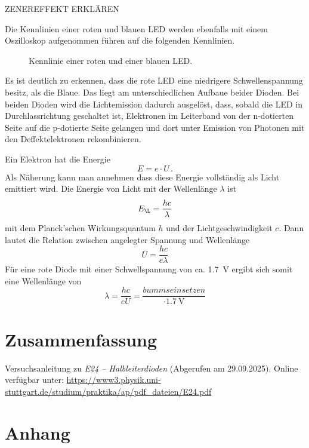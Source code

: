 \documentclass[
12pt,
a4paper,
bibliography=totocnumbered, %
BCOR=1cm, %
oneside, %
]{scrartcl}
\begin{document}
ZENEREFFEKT ERKLÄREN

Die Kennlinien einer roten und blauen LED werden ebenfalls mit einem Oszilloskop aufgenommen führen auf die folgenden Kennlinien.
\begin{figure}[H]
	\caption{Kennlinie einer roten und einer blauen LED.}
	\label{fig:KennlinieLED}
\end{figure}

Es ist deutlich zu erkennen, dass die rote LED eine niedrigere Schwellenspannung besitz, als die Blaue. Das liegt am unterschiedlichen Aufbaue beider Dioden. Bei beiden Dioden wird die Lichtemission dadurch ausgelöst, dass, sobald die LED in Durchlassrichtung geschaltet ist, Elektronen im Leiterband von der n-dotierten Seite auf die p-dotierte Seite gelangen und dort unter Emission von Photonen mit den Deffektelektronen rekombinieren.

Ein Elektron hat die Energie
\begin{equation*}
	E = e \cdot U \,.
\end{equation*}
Als Näherung kann man annehmen dass diese Energie vollständig als Licht emittiert wird. Die Energie von Licht mit der Wellenlänge \(\lambda\) ist
\begin{equation*}
	E_{\L} = \frac{hc}{\lambda}
\end{equation*}
mit dem Planck'schen Wirkungsquantum \(h\) und der Lichtgeschwindigkeit \(c\).
Dann lautet die Relation zwischen angelegter Spannung und Wellenlänge
\begin{equation*}
	U = \frac{hc}{e\lambda}
\end{equation*}
Für eine rote Diode mit einer Schwellspannung von ca. \qty{1,7}{\volt} ergibt sich somit eine Wellenlänge von
\begin{equation*}
	\lambda = \frac{hc}{eU} = \frac{bumms einsetzen}{\cdot \qty{1,7}{\volt}}
\end{equation*}

\section{Zusammenfassung}

\begin{thebibliography}{999}
	 Versuchsanleitung zu \emph{E24 -- Halbleiterdioden} (Abgerufen am 29.09.2025).
	Online verfügbar unter: \url{https://www3.physik.uni-stuttgart.de/studium/praktika/ap/pdf_dateien/E24.pdf}
\end{thebibliography}

\section{Anhang}

%
\end{document}

